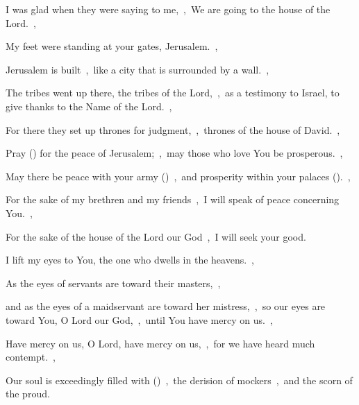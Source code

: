 \documentclass[12pt,twoside,a5paper]{article}
\begin{document}
\begin{normalparskip}
  I was glad when they were saying to me,~\sep\ We are going to the house of the Lord.~\sep


  My feet were standing at your gates, Jerusalem.~\sep

  Jerusalem is built~\sep\ like a city that is surrounded by a wall.~\sep

  The tribes went up there, the tribes of the Lord,~\sep\ as a testimony to Israel, to give thanks to the Name of the Lord.~\sep

  For there they set up thrones for judgment,~\sep\ thrones of the house of David.~\sep

  Pray () for the peace of Jerusalem;~\sep\ may those who love You be prosperous.~\sep

  May there be peace with your army ()~\sep\ and prosperity within your palaces ().~\sep

  For the sake of my brethren and my friends~\sep\ I will speak of peace concerning You.~\sep

  For the sake of the house of the Lord our God~\sep\ I will seek your good.
\end{normalparskip}


\begin{normalparskip}
  I lift my eyes to You, the one who dwells in the heavens.~\sep

  As the eyes of servants are toward their masters,~\sep


  and as the eyes of a maidservant are toward her mistress,~\sep\ so our eyes are toward You, O Lord our God,~\sep\ until You have mercy on us.~\sep

  Have mercy on us, O Lord, have mercy on us,~\sep\ for we have heard much contempt.~\sep

  Our soul is exceedingly filled with ()~\sep\ the derision of mockers~\sep\ and the scorn of the proud.
\end{normalparskip}

\end{document}
